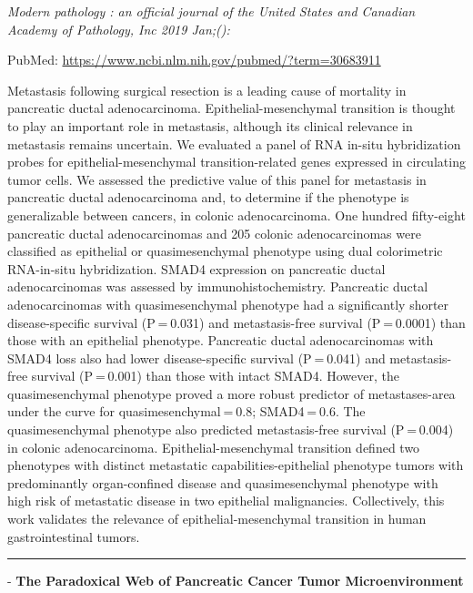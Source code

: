\documentclass[]{article}
\begin{document}
\emph{Modern pathology : an official journal of the United States and
Canadian Academy of Pathology, Inc 2019 Jan;():}

PubMed: \url{https://www.ncbi.nlm.nih.gov/pubmed/?term=30683911}

Metastasis following surgical resection is a leading cause of mortality
in pancreatic ductal adenocarcinoma. Epithelial-mesenchymal transition
is thought to play an important role in metastasis, although its
clinical relevance in metastasis remains uncertain. We evaluated a panel
of RNA in-situ hybridization probes for epithelial-mesenchymal
transition-related genes expressed in circulating tumor cells. We
assessed the predictive value of this panel for metastasis in pancreatic
ductal adenocarcinoma and, to determine if the phenotype is
generalizable between cancers, in colonic adenocarcinoma. One hundred
fifty-eight pancreatic ductal adenocarcinomas and 205 colonic
adenocarcinomas were classified as epithelial or quasimesenchymal
phenotype using dual colorimetric RNA-in-situ hybridization. SMAD4
expression on pancreatic ductal adenocarcinomas was assessed by
immunohistochemistry. Pancreatic ductal adenocarcinomas with
quasimesenchymal phenotype had a significantly shorter disease-specific
survival (P = 0.031) and metastasis-free survival (P = 0.0001) than
those with an epithelial phenotype. Pancreatic ductal adenocarcinomas
with SMAD4 loss also had lower disease-specific survival (P = 0.041) and
metastasis-free survival (P = 0.001) than those with intact SMAD4.
However, the quasimesenchymal phenotype proved a more robust predictor
of metastases-area under the curve for quasimesenchymal = 0.8;
SMAD4 = 0.6. The quasimesenchymal phenotype also predicted
metastasis-free survival (P = 0.004) in colonic adenocarcinoma.
Epithelial-mesenchymal transition defined two phenotypes with distinct
metastatic capabilities-epithelial phenotype tumors with predominantly
organ-confined disease and quasimesenchymal phenotype with high risk of
metastatic disease in two epithelial malignancies. Collectively, this
work validates the relevance of epithelial-mesenchymal transition in
human gastrointestinal tumors.

{}

{}

\begin{center}\rule{0.5\linewidth}{\linethickness}\end{center}

 - \textbf{The Paradoxical Web of Pancreatic Cancer Tumor
Microenvironment}
\end{document}

